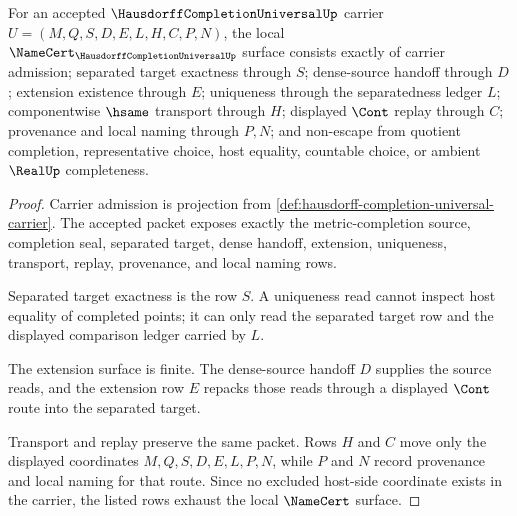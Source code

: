 \begin{theorem}
\label{thm:hausdorff-completion-universal-namecert-obligations}
For an accepted $\HausdorffCompletionUniversalUp$ carrier $U=(M,Q,S,D,E,L,H,C,P,N)$, the local $\NameCert_{\HausdorffCompletionUniversalUp}$ surface consists exactly of carrier admission; separated target exactness through $S$; dense-source handoff through $D$; extension existence through $E$; uniqueness through the separatedness ledger $L$; componentwise $\hsame$ transport through $H$; displayed $\Cont$ replay through $C$; provenance and local naming through $P,N$; and non-escape from quotient completion, representative choice, host equality, countable choice, or ambient $\RealUp$ completeness.
\end{theorem}
\begin{proof}
Carrier admission is projection from \autoref{def:hausdorff-completion-universal-carrier}. The accepted packet exposes exactly the metric-completion source, completion seal, separated target, dense handoff, extension, uniqueness, transport, replay, provenance, and local naming rows.

Separated target exactness is the row $S$. A uniqueness read cannot inspect host equality of completed points; it can only read the separated target row and the displayed comparison ledger carried by $L$.

The extension surface is finite. The dense-source handoff $D$ supplies the source reads, and the extension row $E$ repacks those reads through a displayed $\Cont$ route into the separated target.

Transport and replay preserve the same packet. Rows $H$ and $C$ move only the displayed coordinates $M,Q,S,D,E,L,P,N$, while $P$ and $N$ record provenance and local naming for that route. Since no excluded host-side coordinate exists in the carrier, the listed rows exhaust the local $\NameCert$ surface.
\end{proof}



